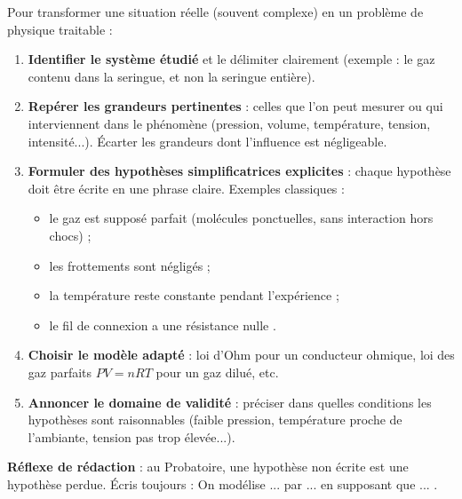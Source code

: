 \documentclass[11pt]{article}
\begin{document}
\begin{methode}
Pour transformer une situation réelle (souvent complexe) en un problème de physique traitable :
\begin{enumerate}
\item \textbf{Identifier le système étudié} et le délimiter clairement (exemple : le gaz contenu dans la seringue, et non la seringue entière).
\item \textbf{Repérer les grandeurs pertinentes} : celles que l'on peut mesurer ou qui interviennent dans le phénomène (pression, volume, température, tension, intensité...). Écarter les grandeurs dont l'influence est négligeable.
\item \textbf{Formuler des hypothèses simplificatrices explicites} : chaque hypothèse doit être écrite en une phrase claire. Exemples classiques :
\begin{itemize}
\item \og le gaz est supposé parfait \fg{} (molécules ponctuelles, sans interaction hors chocs) ;
\item \og les frottements sont négligés \fg{} ;
\item \og la température reste constante pendant l'expérience \fg{} ;
\item \og le fil de connexion a une résistance nulle \fg{}.
\end{itemize}
\item \textbf{Choisir le modèle adapté} : loi d'Ohm pour un conducteur ohmique, loi des gaz parfaits $PV=nRT$ pour un gaz dilué, etc.
\item \textbf{Annoncer le domaine de validité} : préciser dans quelles conditions les hypothèses sont raisonnables (faible pression, température proche de l'ambiante, tension pas trop élevée...).
\end{enumerate}
\textbf{Réflexe de rédaction} : au Probatoire, une hypothèse non écrite est une hypothèse perdue. Écris toujours : \og On modélise ... par ... en supposant que ... \fg{}.
\end{methode}
\end{document}
